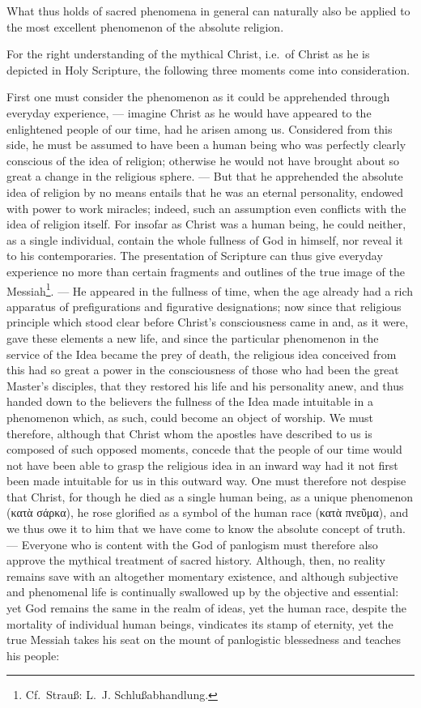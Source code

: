 \documentclass[12pt]{book}
\newcommand{\opage}[1]{\marginnote{\footnotesize\textit{[#1]}}}
\begin{document}
What thus holds of sacred phenomena in general can naturally also be applied to
the most excellent phenomenon of the absolute religion.

For the right understanding of the mythical Christ, i.e.\ of Christ as he is
depicted in Holy Scripture, the following three moments come into
consideration.

First one must consider the phenomenon as it could be apprehended through
everyday experience, --- imagine Christ as he would have appeared to the
enlightened people of our time, had he arisen among us. Considered from this
side, he must be assumed to have been a human being who was perfectly clearly
conscious of the idea of religion; otherwise he would not have brought about so
great a change in the religious sphere. --- But that he apprehended the absolute
idea of religion by no means entails that he was an eternal personality,
endowed with power to work miracles; indeed, such an assumption even conflicts
with the idea of religion itself. For insofar as Christ was a human being, he
could neither, as a single individual, contain the whole fullness of God in
himself, nor reveal it to his contemporaries. The presentation of Scripture can
\opage{134} \setcounter{footnote}{0}%
thus give everyday experience no more than certain fragments and outlines of the
true image of the Messiah\footnote{Cf.\ Strauß: L.~J. Schlußabhandlung.}. ---
He appeared in the fullness of time, when the age already had a rich apparatus
of prefigurations and figurative designations; now since that religious
principle which stood clear before Christ's consciousness came in and, as it
were, gave these elements a new life, and since the particular phenomenon in
the service of the Idea became the prey of death, the religious idea conceived
from this had so great a power in the consciousness of those who had been the
great Master's disciples, that they restored his life and his personality anew,
and thus handed down to the believers the fullness of the Idea made intuitable
in a phenomenon which, as such, could become an object of worship. We must
therefore, although that Christ whom the apostles have described to us is
composed of such opposed moments, concede that the people of our time would not
have been able to grasp the religious idea in an inward way had it not first
been made intuitable for us in this outward way. One must therefore not despise
that Christ, for though he died as a single human being, as a unique phenomenon
(κατὰ σάρκα), he rose glorified as a symbol of the human race
(κατὰ πνεῦμα), and we thus owe it to him that we have come to know the absolute
concept of truth. --- Everyone who is content with the God of panlogism must
therefore also approve the mythical treatment of sacred history. Although, then,
no reality remains save with an altogether momentary existence, and although
subjective and phenomenal life is continually swallowed up by the objective and
essential: yet God remains the same in the realm of ideas, yet the human race,
despite the mortality of individual human beings, vindicates its stamp of
eternity, yet the true
\opage{135} Messiah takes his seat on the mount of panlogistic blessedness and
teaches his people:
\end{document}
